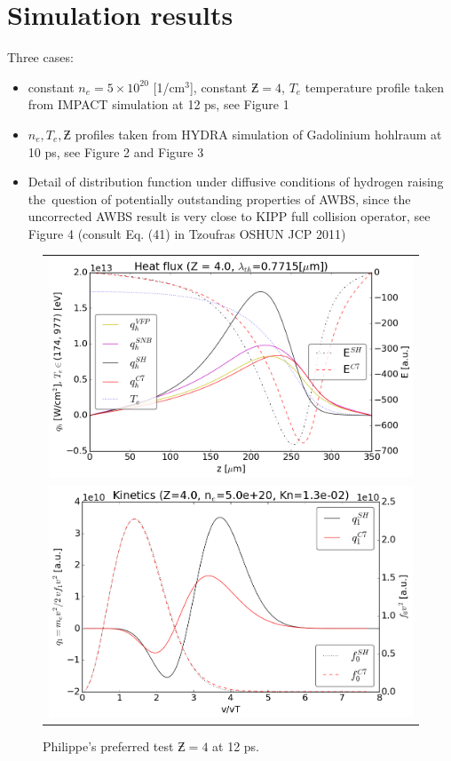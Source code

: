 \documentclass[preprint,12pt]{elsarticle}
\newcommand{\figref}[1]{FIG.~\ref{#1}}
\begin{document}
\section{Simulation results}\label{sec:results}
Three cases:
\begin{itemize}
  \item constant $n_e = 5\times10^{20}$ [1/cm$^3$], constant $\Zbar = 4$, 
  $T_e$ temperature profile taken from IMPACT simulation at 12 ps, see Figure 1
  \item $n_e, T_e, \Zbar$ profiles taken from HYDRA simulation of Gadolinium
  hohlraum at 10 ps, see Figure 2 and Figure 3
  \item Detail of distribution function under diffusive conditions of hydrogen 
  raising the~question of potentially outstanding properties of AWBS, since
  the uncorrected AWBS result is very close to KIPP full collision operator,
  see Figure 4 (consult Eq. (41) in Tzoufras OSHUN JCP 2011) 
\end{itemize}
\begin{figure}[tbh]
  \begin{center}
    \begin{tabular}{c}
      \includegraphics[width=1.0\textwidth]{../VFPdata/C7_heatflux_12ps.png} \\ 
      \includegraphics[width=1.0\textwidth]{../VFPdata/C7_kinetics_12ps.png}
    \end{tabular}
  \caption{
  Philippe's preferred test $\Zbar = 4$ at 12 ps.  
  }
  \end{center}
  \label{fig:Philippe_VFP_12ps}
\end{figure}
\end{document}
